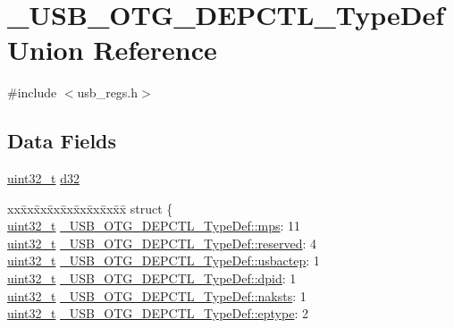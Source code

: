 \hypertarget{union___u_s_b___o_t_g___d_e_p_c_t_l___type_def}{\section{\-\_\-\-U\-S\-B\-\_\-\-O\-T\-G\-\_\-\-D\-E\-P\-C\-T\-L\-\_\-\-Type\-Def Union Reference}
\label{union___u_s_b___o_t_g___d_e_p_c_t_l___type_def}
}


{\ttfamily \#include $<$usb\-\_\-regs.\-h$>$}

\subsection*{Data Fields}
\begin{DoxyCompactItemize}
\item 
\hyperlink{stdint_8h_a435d1572bf3f880d55459d9805097f62}{uint32\-\_\-t} \hyperlink{group___u_s_b___o_t_g___d_r_i_v_e_r_ga606834f84b3675107103bc88973835cb}{d32}
\item 
\begin{tabbing}
xx\=xx\=xx\=xx\=xx\=xx\=xx\=xx\=xx\=\kill
struct \{\\
\>\hyperlink{stdint_8h_a435d1572bf3f880d55459d9805097f62}{uint32\_t} \hyperlink{group___u_s_b___o_t_g___d_r_i_v_e_r_gaee25bec8b0ce21c22dc927bc651c0bcd}{\_USB\_OTG\_DEPCTL\_TypeDef::mps}: 11\\
\>\hyperlink{stdint_8h_a435d1572bf3f880d55459d9805097f62}{uint32\_t} \hyperlink{group___u_s_b___o_t_g___d_r_i_v_e_r_ga0ba2580866ac970f191b94772a602611}{\_USB\_OTG\_DEPCTL\_TypeDef::reserved}: 4\\
\>\hyperlink{stdint_8h_a435d1572bf3f880d55459d9805097f62}{uint32\_t} \hyperlink{group___u_s_b___o_t_g___d_r_i_v_e_r_gab3805d715faba1f50520d202c9da5be0}{\_USB\_OTG\_DEPCTL\_TypeDef::usbactep}: 1\\
\>\hyperlink{stdint_8h_a435d1572bf3f880d55459d9805097f62}{uint32\_t} \hyperlink{group___u_s_b___o_t_g___d_r_i_v_e_r_gac4b8b9dfdf722dd3e1fed849bf8ea7ba}{\_USB\_OTG\_DEPCTL\_TypeDef::dpid}: 1\\
\>\hyperlink{stdint_8h_a435d1572bf3f880d55459d9805097f62}{uint32\_t} \hyperlink{group___u_s_b___o_t_g___d_r_i_v_e_r_gac13fa9b6bc3238163c2efd7df474dc04}{\_USB\_OTG\_DEPCTL\_TypeDef::naksts}: 1\\
\>\hyperlink{stdint_8h_a435d1572bf3f880d55459d9805097f62}{uint32\_t} \hyperlink{group___u_s_b___o_t_g___d_r_i_v_e_r_ga9d1e5bf3f406fb64d10b7a54a4302dcc}{\_USB\_OTG\_DEPCTL\_TypeDef::eptype}: 2\\

\end{tabbing}
\end{DoxyCompactItemize}
